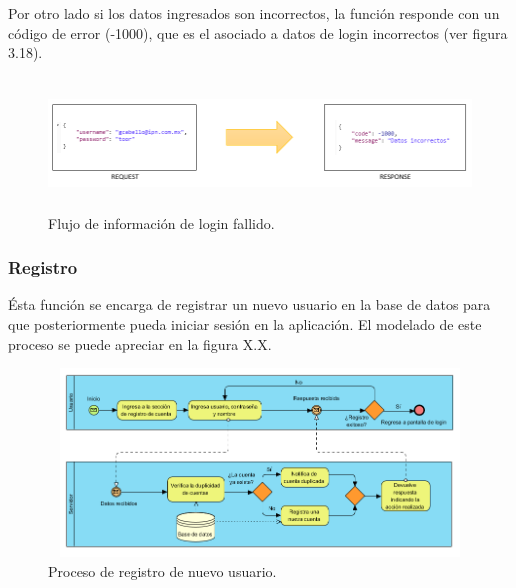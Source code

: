 Por otro lado si los datos ingresados son incorrectos, la función responde con un código de error (-1000), que es el asociado a datos de login incorrectos (ver figura 3.18). 
\begin{figure}[h!]
	\centering
	\includegraphics[width=15cm,height=3.5cm]{imagenes/desarrollo/arquitectura/LOGIN_FAIL.png}
	\caption{Flujo de información de login fallido.}
	\label{fig:loginfail}
\end{figure}

\subsubsection{Registro}
Ésta función se encarga de registrar un nuevo usuario en la base de datos para que posteriormente pueda iniciar sesión en la aplicación. El modelado de este proceso se puede apreciar en la figura X.X. \par
\begin{figure}[h!]
	\centering
	\includegraphics[width=15cm,height=5cm]{imagenes/desarrollo/diagramas/BPMN_REGISTRAR_CUENTA.png}
	\caption{Proceso de registro de nuevo usuario.}
	\label{fig:regsuccess}
\end{figure}



